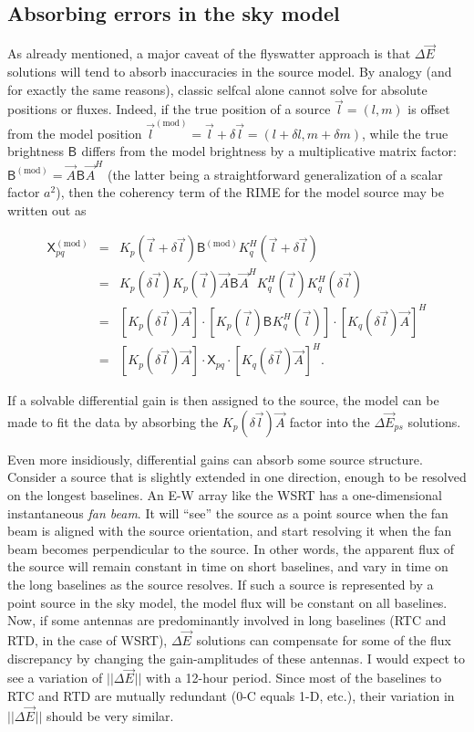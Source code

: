 \documentclass[]{aa}
\newcommand{\herm}{H}
\newcommand{\jones}[2]{\vec {#1}_{#2}}
\newcommand{\jonesT}[2]{\vec {#1}^{\herm}_{#2}}
\newcommand{\coh}[2]{\mathsf{{#1}}_{{#2}}}
\begin{document}
\subsection{Absorbing errors in the sky model\label{sec:de-analysis-model}}

As already mentioned, a major caveat of the flyswatter approach is that $\Delta\jones{E}{}$ solutions will tend to absorb inaccuracies in the source model. By analogy (and for exactly the same reasons), classic selfcal 
alone cannot solve for absolute positions or fluxes. Indeed, if the true position of a source $\vec l = (l,m)$ is offset from the model position $\vec l^\mathrm{(mod)} = \vec l + \delta\vec l = (l+\delta l,m + \delta m)$, while the true brightness $\coh{B}{}$ differs from the model brightness by a multiplicative matrix factor: $\coh{B}{}^\mathrm{(mod)} = \jones{A}{} \coh{B}{} \jonesT{A}{}$ (the latter being a straightforward generalization of a scalar factor $a^2$), then the coherency term of the RIME for the model source may be written out as

\begin{eqnarray*}
\coh{X}{pq}^\mathrm{(mod)} & = & K_{p}(\vec l + \delta\vec l) \coh{B}{}^\mathrm{(mod)} K^\herm_{q}(\vec l + \delta\vec l) \\
 & = & K_{p}(\delta\vec l) K_{p}(\vec l) \jones{A}{}\coh{B}{}\jonesT{A}{} K^\herm_{q}(\vec l) K^\herm_{q}(\delta\vec l) \\
 & = & [ K_{p}(\delta\vec l)\jones{A}{}]\cdot[K_{p}(\vec l)\coh{B}{}K^\herm_{q}(\vec l)]\cdot[K_{q}(\delta \vec l)\jones{A}{}]^\herm \\
 & = & [K_{p}(\delta\vec l)\jones{A}{}] 
       \cdot \coh{X}{pq} \cdot 
       [K_{q}(\delta\vec l)\jones{A}{}]^\herm.
\end{eqnarray*}

If a solvable differential gain is then assigned to the source, the model can be made to fit the data by absorbing the $K_{p}(\delta\vec l)\jones{A}{}$ factor into the $\Delta\jones{E}{ps}$ solutions.

Even more insidiously, differential gains can absorb some source structure. Consider a source that is slightly extended in one direction, enough to be resolved on the longest baselines. An E-W array like the WSRT has a one-dimensional instantaneous {\em fan beam}. It will ``see'' the source as a point source when the fan beam is aligned with the source orientation, and start resolving it when the fan beam becomes perpendicular to the source. In other words, the apparent flux of the source will remain constant in time on short baselines, and vary in time on the long baselines as the source resolves. If such a source is represented by a point source in the sky model, the model flux will be constant on all baselines. Now, if some antennas are predominantly involved in long baselines (RTC and RTD, in the case of WSRT), $\Delta\jones{E}{}$ solutions can compensate for some of the flux discrepancy by changing the gain-amplitudes of these antennas. I would expect to see a variation of $||\Delta\jones{E}{}||$ with a 12-hour period. Since most of the baselines to RTC and RTD are mutually redundant (0-C equals 1-D, etc.), their variation in $||\Delta\jones{E}{}||$ should be very similar. 
\end{document}
